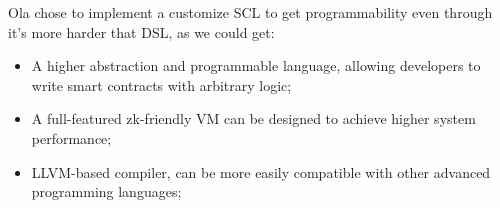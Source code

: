 Ola chose to implement a customize SCL to get programmability even through it's more harder that DSL, as we could get:
 \begin{itemize}
 \item A higher abstraction and programmable language, allowing developers to write smart contracts with arbitrary logic;
 \item A full-featured zk-friendly VM can be designed to achieve higher system performance;
 \item LLVM-based compiler, can be more easily compatible with other advanced programming languages;
\end{itemize}